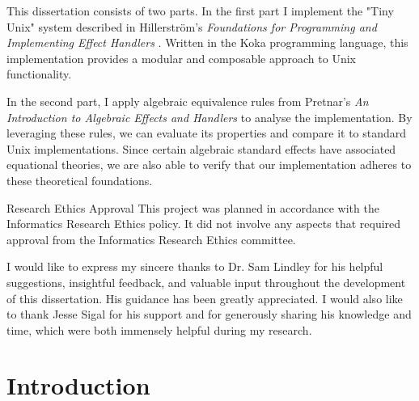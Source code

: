 \documentclass[logo,bsc,singlespacing,parskip]{infthesis}
\begin{document}
\begin{preliminary}
{This dissertation consists of two parts. In the first part I implement the "Tiny Unix" system described in Hillerström’s \textit{Foundations for Programming and Implementing Effect Handlers} \cite{hillerstrom_foundations_nodate}. Written in the Koka programming language, this implementation provides a modular and composable approach to Unix functionality. 

In the second part, I apply algebraic equivalence rules from Pretnar’s \textit{An Introduction to Algebraic Effects and Handlers} \cite{pretnar_introduction_2015} to analyse the implementation. By leveraging these rules, we can evaluate its properties and compare it to standard Unix implementations. Since certain algebraic standard effects have associated equational theories, we are also able to verify that our implementation adheres to these theoretical foundations.
}

\maketitle

\newenvironment{ethics}
   {\begin{frontenv}{Research Ethics Approval}{\LARGE}}
   {\end{frontenv}\newpage}

\begin{ethics}
This project was planned in accordance with the Informatics Research
Ethics policy. It did not involve any aspects that required approval
from the Informatics Research Ethics committee.

\standarddeclaration
\end{ethics}


\begin{acknowledgements}
I would like to express my sincere thanks to Dr. Sam Lindley for his helpful suggestions, insightful feedback, and valuable input throughout the development of this dissertation. His guidance has been greatly appreciated. I would also like to thank Jesse Sigal for his support and for generously sharing his knowledge and time, which were both immensely helpful during my research.
\end{acknowledgements}


\tableofcontents
\end{preliminary}


\chapter{Introduction}
\end{document}
